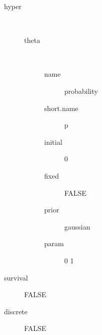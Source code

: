 \begin{description}
	\item[hyper]\ 
	 \begin{description}
	 	\item[theta]\ 
	 	 \begin{description}
	 	 	 \item[ name ] probability 
	 	 	 \item[ short.name ] p 
	 	 	 \item[ initial ] 0 
	 	 	 \item[ fixed ] FALSE 
	 	 	 \item[ prior ] gaussian 
	 	 	 \item[ param ] 0 1 
	 	 \end{description}
	 \end{description}
	 \item[ survival ] FALSE 
	 \item[ discrete ] FALSE 
\end{description}
